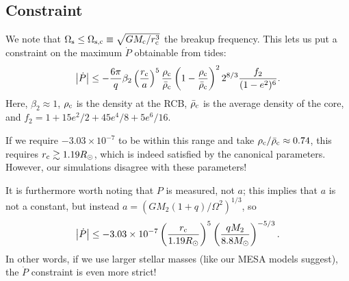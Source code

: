 \documentclass[11pt,
        usenames, %
        dvipsnames %
    ]{article}
\newcommand*{\abs}[1]{\left|#1\right|}
\newcommand*{\p}[1]{\left(#1\right)}
\begin{document}
\subsection{Constraint}

We note that $\Omega_{\rm s} \leq \Omega_{\rm s, c} \equiv \sqrt{GM_{\rm c} /
r_{\rm c}^3}$ the breakup frequency. This lets us put a constraint on the
maximum $\dot{P}$ obtainable from tides:
\begin{equation}
    \abs{\dot{P}} \leq
        -\frac{6\pi}{q}\beta_2 \left(\frac{r_{\rm c}}{a}\right)^5
        \frac{\rho_{\rm c}}{\bar{\rho}_{\rm c}} \left(1 -
        \frac{\rho_{\rm c}}{\bar{\rho}_{\rm c}}\right)^2 2^{8/3}\frac{f_2}{(1 -
        e^2)^6}.
\end{equation}
Here, $\beta_2 \approx 1$, $\rho_{\rm c}$ is the density at the RCB,
$\bar{\rho}_{\rm c}$ is the average density of the core, and $f_2 = 1 + 15e^2/2 +
45e^4/8 + 5e^6/16$.

If we require $-3.03 \times 10^{-7}$ to be within this range and take $\rho_{\rm
c}/ \bar{\rho}_{\rm c} \approx 0.74$, this requires $r_{\rm c} \gtrsim
1.19R_{\odot}$, which is indeed satisfied by the canonical parameters. However,
our simulations disagree with these parameters!

It is furthermore worth noting that $P$ is measured, not $a$; this implies that
$a$ is not a constant, but instead $a = \p{GM_2(1 + q) / \Omega^2}^{1/3}$, so
\begin{equation}
    \abs{\dot{P}} \leq -3.03 \times 10^{-7}\p{\frac{r_{\rm c}}{1.19R_{\odot}}}^5
        \p{\frac{qM_2}{8.8M_{\odot}}}^{-5/3}.
\end{equation}
In other words, if we use larger stellar masses (like our MESA models suggest),
the $\dot{P}$ constraint is even more strict!
\end{document}
